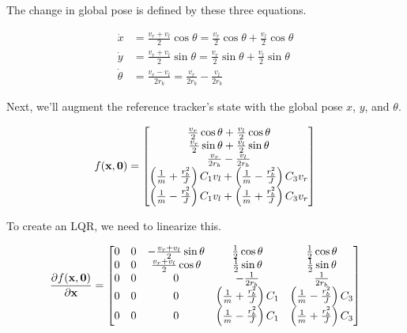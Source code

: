 The change in global pose is defined by these three equations.

\begin{align*}
  \dot{x} &= \frac{v_r + v_l}{2}\cos\theta = \frac{v_r}{2}\cos\theta +
    \frac{v_l}{2}\cos\theta \\
  \dot{y} &= \frac{v_r + v_l}{2}\sin\theta = \frac{v_r}{2}\sin\theta +
    \frac{v_l}{2}\sin\theta \\
  \dot{\theta} &= \frac{v_r - v_l}{2r_b} = \frac{v_r}{2r_b} - \frac{v_l}{2r_b}
\end{align*}

Next, we'll augment the reference tracker's state with the global pose $x$, $y$,
and $\theta$.

\begin{equation}
  f(\mathbf{x}, \mathbf{0}) =
  \begin{bmatrix}
    \frac{v_r}{2}\cos\theta + \frac{v_l}{2}\cos\theta \\
    \frac{v_r}{2}\sin\theta + \frac{v_l}{2}\sin\theta \\
    \frac{v_r}{2r_b} - \frac{v_l}{2r_b} \\
    \left(\frac{1}{m} + \frac{r_b^2}{J}\right) C_1 v_l +
      \left(\frac{1}{m} - \frac{r_b^2}{J}\right) C_3 v_r \\
    \left(\frac{1}{m} - \frac{r_b^2}{J}\right) C_1 v_l +
      \left(\frac{1}{m} + \frac{r_b^2}{J}\right) C_3 v_r
  \end{bmatrix}
  \label{eq:linearized_drivetrain_f}
\end{equation}

To create an LQR, we need to linearize this.

\begin{equation*}
  \frac{\partial f(\mathbf{x}, \mathbf{0})}{\partial\mathbf{x}} =
  \begin{bmatrix}
    0 & 0 & -\frac{v_r + v_l}{2}\sin\theta & \frac{1}{2}\cos\theta &
      \frac{1}{2}\cos\theta \\
    0 & 0 & \frac{v_r + v_l}{2}\cos\theta & \frac{1}{2}\sin\theta &
      \frac{1}{2}\sin\theta \\
    0 & 0 & 0 & -\frac{1}{2r_b} & \frac{1}{2r_b} \\
    0 & 0 & 0 & \left(\frac{1}{m} + \frac{r_b^2}{J}\right) C_1 &
      \left(\frac{1}{m} - \frac{r_b^2}{J}\right) C_3 \\
    0 & 0 & 0 & \left(\frac{1}{m} - \frac{r_b^2}{J}\right) C_1 &
      \left(\frac{1}{m} + \frac{r_b^2}{J}\right) C_3
  \end{bmatrix}
\end{equation*}

